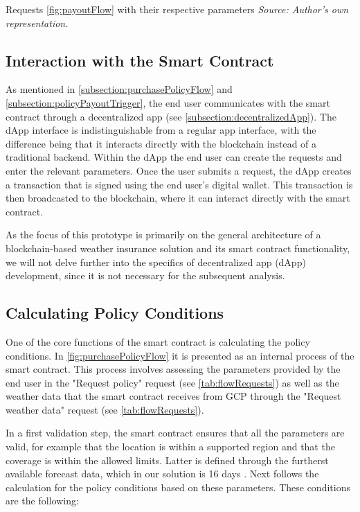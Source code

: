 \begin{table}[h]
    \centering
    
    \caption{Requests \cref{fig:payoutFlow} with their respective parameters \textit{Source: Author's own representation.}}
    \label{tab:payoutFlowRequests}
\end{table}

\subsection{Interaction with the Smart Contract}

As mentioned in \cref{subsection:purchasePolicyFlow} and \cref{subsection:policyPayoutTrigger}, the end user communicates with the smart contract through a decentralized app (see \cref{subsection:decentralizedApp}). The dApp interface is indistinguishable from a regular app interface, with the difference being that it interacts directly with the blockchain instead of a traditional backend. Within the dApp the end user can create the requests and enter the relevant parameters. Once the user submits a request, the dApp creates a transaction that is signed using the end user's digital wallet. This transaction is then broadcasted to the blockchain, where it can interact directly with the smart contract.

As the focus of this prototype is primarily on the general architecture of a blockchain-based weather insurance solution and its smart contract functionality, we will not delve further into the specifics of decentralized app (dApp) development, since it is not necessary for the subsequent analysis.

\subsection{Calculating Policy Conditions}

One of the core functions of the smart contract is calculating the policy conditions. In \cref{fig:purchasePolicyFlow} it is presented as an internal process of the smart contract. This process involves assessing the parameters provided by the end user in the "Request policy" request (see \cref{tab:flowRequests}) as well as the weather data that the smart contract receives from GCP through the "Request weather data" request (see \cref{tab:flowRequests}).

In a first validation step, the smart contract ensures that all the parameters are valid, for example that the location is within a supported region and that the coverage is within the allowed limits. Latter is defined through the furtherst available forecast data, which in our solution is 16 days \autocite{NOAA_GFS}. Next follows the calculation for the policy conditions based on these parameters. These conditions are the following:

